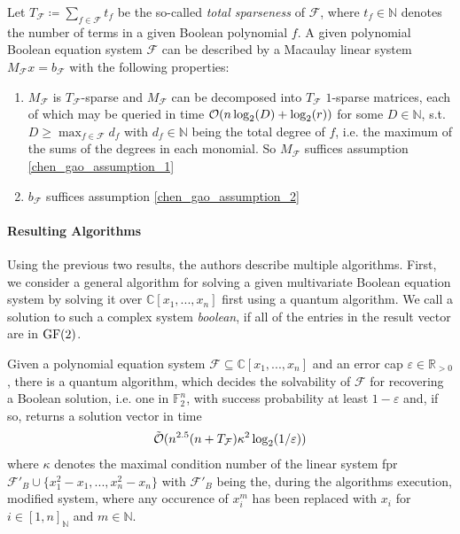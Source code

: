 \begin{theorem}
    Let \(T_{\mathcal{F}} \coloneqq \sum_{f \in \mathcal{F}} t_f\) be the so-called \emph{total sparseness} of \(\mathcal{F}\), where \(t_f \in \mathbb{N}\) denotes the number of terms in a given Boolean polynomial \(f\). A given polynomial Boolean equation system \(\mathcal{F}\) can be described by a Macaulay linear system \(M_{\mathcal{F}}x=b_{\mathcal{F}}\) with the following properties:
    \begin{enumerate}[label=\alph*)]
        \item \(M_{\mathcal{F}}\) is \(T_{\mathcal{F}}\)-sparse and \(M_{\mathcal{F}}\) can be decomposed into \(T_{\mathcal{F}}\) \(1\)-sparse matrices, each of which may be queried in time \(\operatorname{\mathcal{O}}(n\log_2(D)+\log_2(r))\) for some \(D \in \mathbb{N}\), s.t. \(D \geq \max_{f \in \mathcal{F}} d_f\) with \(d_f \in \mathbb{N}\) being the total degree of \(f\), i.e. the maximum of the sums of the degrees in each monomial. So \(M_{\mathcal{F}}\) suffices assumption \ref{chen_gao_assumption_1}
        \item \(b_{\mathcal{F}}\) suffices assumption \ref{chen_gao_assumption_2}
    \end{enumerate}
\end{theorem}

\paragraph*{Resulting Algorithms} Using the previous two results, the authors describe multiple algorithms. First, we consider a general algorithm for solving a given multivariate Boolean equation system by solving it over \(\mathbb{C}[x_1, ..., x_n]\) first using a quantum algorithm. We call a solution to such a complex system \emph{boolean}, if all of the entries in the result vector are in \(\operatorname{GF}(2)\).

\begin{theorem} \label{chen_gao_boolean_polynomial_system_solving_algorithm_1}
    Given a polynomial equation system \(\mathcal{F} \subseteq \mathbb{C}[x_1, ..., x_n]\) and an error cap \(\varepsilon \in \mathbb{R}_{> 0}\), there is a quantum algorithm, which decides the solvability of \(\mathcal{F}\) for recovering a Boolean solution, i.e. one in \(\mathbb{F}_2^n\), with success probability at least \(1-\varepsilon\) and, if so, returns a solution vector in time
    \begin{align}
        \tilde{\operatorname{\mathcal{O}}}(n^{2.5}(n+T_{\mathcal{F}})\kappa^2\log_2(1/\varepsilon))
    \end{align}
    where \(\kappa\) denotes the maximal condition number of the linear system fpr \(\mathcal{F}'_B \cup \{x_1^2-x_1, ..., x_n^2-x_n\}\) with \(\mathcal{F}'_B\) being the, during the algorithms execution, modified system, where any occurence of \(x_i^m\) has been replaced with \(x_i\) for \(i \in [1, n]_{\mathbb{N}}\) and \(m \in \mathbb{N}\).
\end{theorem}

